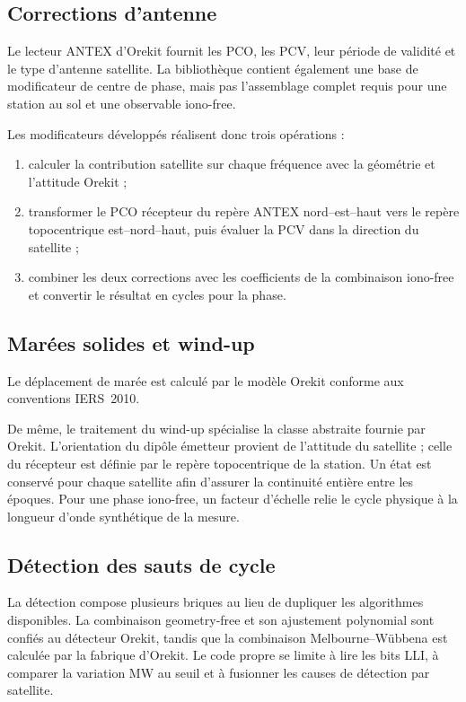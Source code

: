 \subsection{Corrections d'antenne}

Le lecteur ANTEX d'Orekit fournit les PCO, les PCV, leur période de validité et
le type d'antenne satellite. La bibliothèque contient également une base de
modificateur de centre de phase, mais pas l'assemblage complet requis pour une
station au sol et une observable iono-free.

Les modificateurs développés réalisent donc trois opérations :

\begin{enumerate}
    \item calculer la contribution satellite sur chaque fréquence avec la
    géométrie et l'attitude Orekit ;
    \item transformer le PCO récepteur du repère ANTEX nord--est--haut vers le
    repère topocentrique est--nord--haut, puis évaluer la PCV dans la direction
    du satellite ;
    \item combiner les deux corrections avec les coefficients de la
    combinaison iono-free et convertir le résultat en cycles pour la
    phase.
\end{enumerate}

\subsection{Marées solides et wind-up}

Le déplacement de marée est calculé par le modèle Orekit conforme aux
conventions IERS~2010.

De même, le traitement du wind-up spécialise la classe abstraite fournie par
Orekit. L'orientation du dipôle émetteur provient de l'attitude du satellite ;
celle du récepteur est définie par le repère topocentrique de la station. Un
état est conservé pour chaque satellite afin d'assurer la continuité entière
entre les époques. Pour une phase iono-free, un facteur d'échelle relie
le cycle physique à la longueur d'onde synthétique de la mesure.


\subsection{Détection des sauts de cycle}

La détection compose plusieurs briques au lieu de dupliquer les algorithmes
disponibles. La combinaison geometry-free et son ajustement polynomial sont
confiés au détecteur Orekit, tandis que la combinaison Melbourne--Wübbena est
calculée par la fabrique d'Orekit. Le code propre se limite à lire les bits LLI,
à comparer la variation MW au seuil et à fusionner les causes de détection par
satellite.

